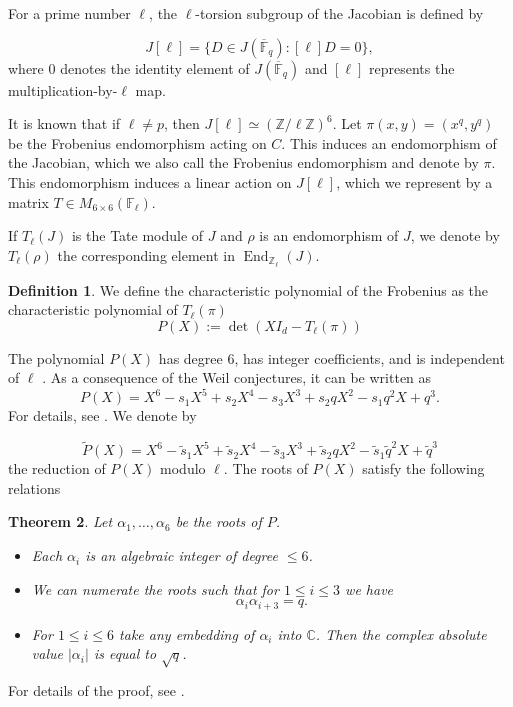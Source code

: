 \documentclass[11pt,a4paper]{article}
\theoremstyle{plain}
\newtheorem{theorem}{Theorem}[section]
\theoremstyle{definition}
\newtheorem{defi}[theorem]{Definition}
\theoremstyle{remark}
\begin{document}
For a prime number \( \ell\),  the \( \ell \)-torsion subgroup of the Jacobian is defined by

$$ J[\ell]=\{D\in J(\overline{\mathbb{F}}_q): [\ell]D=0\}, $$
 where $0$ denotes the identity element of $J(\overline{\mathbb{F}}_q)$ and $[\ell]$ represents the multiplication-by-$\ell$ map.

It is known that if \( \ell\neq p\), then
$J[\ell]\simeq (\mathbb{Z}/\ell\mathbb{Z})^6$.
Let $\pi(x,y)=(x^q,y^q)$ be the Frobenius endomorphism acting on $C$. This induces an endomorphism of the Jacobian, which we also call the Frobenius endomorphism and denote by $\pi$. This endomorphism induces a linear action on \( J[\ell] \),
which we represent by a matrix \( T\in M_{6\times 6}( \mathbb{F}_{\ell} )\).

If $T_{\ell}(J)$ is the Tate module of $J$ and $\rho$ is an endomorphism of $J$, we denote by $T_{\ell}(\rho)$ the corresponding
element in $\operatorname{End}_{\mathbb{Z}_{\ell}}(J)$.
\begin{defi}
We define the characteristic polynomial of the Frobenius  as the characteristic polynomial of $T_{\ell}(\pi)$
$$P(X):=\det(XI_d-T_{\ell}(\pi))$$
\end{defi}
The polynomial $P(X)$ has degree 6, has integer coefficients, and is independent of $\ell$ \cite[Theorem 4.83]{2005ehcc}. As a consequence of the Weil conjectures, it can be written as
\begin{equation*}
  P(X) = X^{6} - s_{1}X^{5} + s_{2}X^{4} - s_{3}X^{3} + s_{2}qX^{2} - s_{1}q^{2}X + q^{3}.  
\end{equation*}
For details, see \cite[Proposition 8.4]{2005ehcc}. We denote by

\begin{equation*}
  \widetilde{P}(X) = X^{6} - \widetilde{s}_{1}X^{5} + \widetilde{s}_{2}X^{4} - \widetilde{s}_{3}X^{3} + \widetilde{s}_{2}qX^{2} - \widetilde{s}_{1}\widetilde{q}^{2}X + \widetilde{q}^{3}      
\end{equation*}
the reduction of $P(X)$ modulo $\ell$. The roots of $P(X)$ satisfy the following relations
\begin{theorem}\cite[Theorem 5.76]{2005ehcc}\label{roots}
Let \(\alpha_1,\ldots,\alpha_6\) be the roots of $P$. 
\begin{itemize}
    \item[(i)] Each $\alpha_i$ is an algebraic integer of degree $\leqslant 6$.
    \item[(ii)] We can numerate the roots such that for $1 \leqslant i \leqslant 3$ we have
    \[
    \alpha_i \alpha_{i+3} = q.
    \]
    \item[(iii)] For $1 \leqslant i \leqslant 6$ take any embedding of $\alpha_i$ into $\mathbb{C}$. Then the complex absolute value $|\alpha_i|$ is equal to $\sqrt{q}$.
\end{itemize}

\end{theorem}
For details of the proof, see \cite[Theorem 5.1.15]{Stichtenoth1993}.
\end{document}
